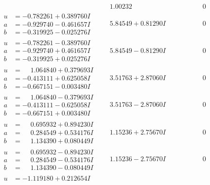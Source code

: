 \documentclass[1p]{elsarticle_modified}
\theoremstyle{definition}
\begin{document}
$$\begin{array}{c|c|c}
 & \phantom{-}1.00232\phantom{ +0.000000I} & \phantom{-0.000000 } 0 \\ \hline\begin{aligned}
u &= -0.782261 + 0.389760 I \\
a &= -0.929740 - 0.461657 I \\
b &= -0.319925 - 0.025276 I\end{aligned}
 & \phantom{-}5.84549 + 0.81290 I & \phantom{-0.000000 } 0 \\ \hline\begin{aligned}
u &= -0.782261 - 0.389760 I \\
a &= -0.929740 + 0.461657 I \\
b &= -0.319925 + 0.025276 I\end{aligned}
 & \phantom{-}5.84549 - 0.81290 I & \phantom{-0.000000 } 0 \\ \hline\begin{aligned}
u &= \phantom{-}1.064840 + 0.379693 I \\
a &= -0.413111 + 0.625058 I \\
b &= -0.667151 - 0.003480 I\end{aligned}
 & \phantom{-}3.51763 + 2.87060 I & \phantom{-0.000000 } 0 \\ \hline\begin{aligned}
u &= \phantom{-}1.064840 - 0.379693 I \\
a &= -0.413111 - 0.625058 I \\
b &= -0.667151 + 0.003480 I\end{aligned}
 & \phantom{-}3.51763 - 2.87060 I & \phantom{-0.000000 } 0 \\ \hline\begin{aligned}
u &= \phantom{-}0.695932 + 0.894230 I \\
a &= \phantom{-}0.284549 + 0.534176 I \\
b &= \phantom{-}1.134390 + 0.080449 I\end{aligned}
 & \phantom{-}1.15236 + 2.75670 I & \phantom{-0.000000 } 0 \\ \hline\begin{aligned}
u &= \phantom{-}0.695932 - 0.894230 I \\
a &= \phantom{-}0.284549 - 0.534176 I \\
b &= \phantom{-}1.134390 - 0.080449 I\end{aligned}
 & \phantom{-}1.15236 - 2.75670 I & \phantom{-0.000000 } 0 \\ \hline\begin{aligned}
u &= -1.119180 + 0.212654 I \\

\end{aligned}
\end{array}$$
\end{document}
